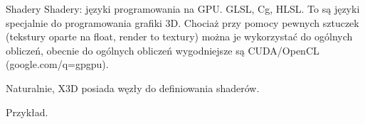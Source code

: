 \documentclass{beamer}
\begin{document}
\begin{frame}{Shadery}
Shadery: języki programowania na GPU. GLSL, Cg, HLSL. To są języki specjalnie do programowania grafiki 3D. Chociaż przy pomocy pewnych sztuczek (tekstury oparte na float, render to textury) można je wykorzystać do ogólnych obliczeń, obecnie do ogólnych obliczeń wygodniejsze są CUDA/OpenCL (google.com/q=gpgpu).

Naturalnie, X3D posiada węzły do definiowania shaderów.

Przykład.
\end{frame}
\end{document}
